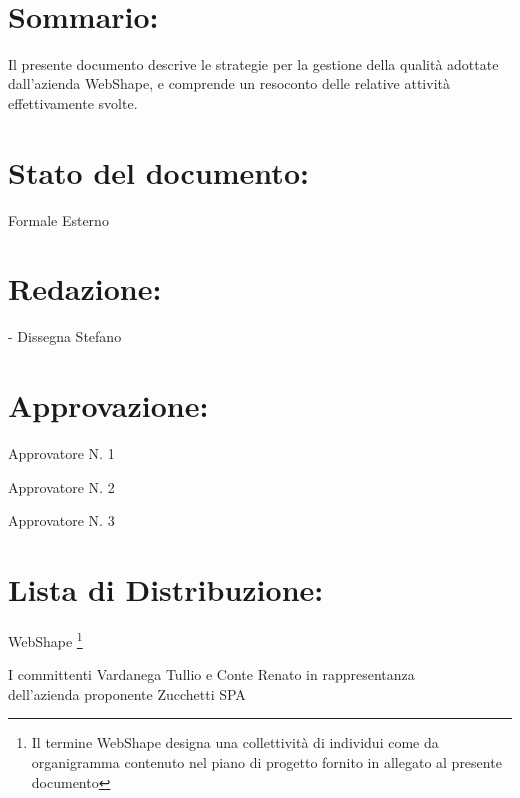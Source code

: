 \newpage

\begin{center} %
	\begin{Huge}	
				\textbf{\TITOLODOC}
			\\
	\end{Huge}
\end{center}

\section*{\Large Sommario:} %
\indent \indent
Il presente documento descrive le strategie per la gestione della qualit\`a adottate dall'azienda WebShape, e comprende un resoconto delle relative attivit\`a effettivamente svolte.

\section*{\Large Stato del documento:}
\indent \indent
	Formale Esterno

\section*{\Large Redazione:}
	\begin{elencopuntato}[\normindent]
		\item[-] Dissegna Stefano
	\end{elencopuntato}

\section*{\Large Approvazione:}
	\begin{elencopuntato}[\normindent]
		\item Approvatore N. 1
		\item Approvatore N. 2
		\item Approvatore N. 3
	\end{elencopuntato}

\section*{\LARGE Lista di Distribuzione:}

	\begin{elenconumerato}{\normindent}
		\item WebShape \footnote{Il termine WebShape designa una collettivit\`a di individui come da organigramma contenuto nel piano di progetto fornito in allegato al presente documento}
		\item I committenti Vardanega Tullio e Conte Renato in rappresentanza \\  dell'azienda proponente Zucchetti SPA
	\end{elenconumerato}

